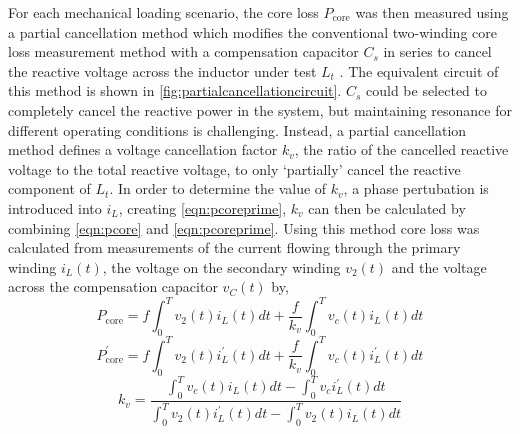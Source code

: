 \documentclass[conference]{IEEEtran}
\begin{document}
For each mechanical loading scenario, the core loss $P_\text{core}$ was then measured using a partial cancellation method which modifies the conventional two-winding core loss measurement method with a compensation capacitor $C_s$ in series to cancel the reactive voltage across the inductor under test $L_t$ \cite{houNewHighFrequencyCore2017}. 
The equivalent circuit of this method is shown in \cref{fig:partialcancellationcircuit}.
$C_s$ could be selected to completely cancel the reactive power in the system, but maintaining resonance for different operating conditions is challenging. 
Instead, a partial cancellation method defines a voltage cancellation factor $k_v$, the ratio of the cancelled reactive voltage to the total reactive voltage, to only `partially' cancel the reactive component of $L_t$. 
In order to determine the value of $k_v$, a phase pertubation is introduced into $i_L$, creating \cref{eqn:pcoreprime}, $k_v$ can then be calculated by combining \cref{eqn:pcore} and \cref{eqn:pcoreprime}.
Using this method core loss was calculated from measurements of the current flowing through the primary winding $i_L(t)$, the voltage on the secondary winding $v_2(t)$ and the voltage across the compensation capacitor $v_C(t)$ by, 
\begin{equation}
  P_\text{core} = f \int_0^T v_2(t)i_L(t)dt + \frac{f}{k_v} \int_0^T v_c(t)i_L(t) dt
  \label{eqn:pcore}
\end{equation}
\begin{equation}
  P_\text{core}^{\prime} = f \int_0^T v_2(t)i_L^{\prime} (t)dt + \frac{f}{k_v} \int_0^T v_c(t)i_L^{\prime}(t) dt
  \label{eqn:pcoreprime}
\end{equation}
\begin{equation}
  k_v = \frac{\int_0^T v_c(t)i_L(t)dt - \int_0^T v_ci_L^\prime(t)dt}{\int_0^T v_2(t) i_L^\prime(t) dt - \int_0^T v_2(t) i_L(t) dt}
  \label{eqn:kv}
\end{equation}
\end{document}

